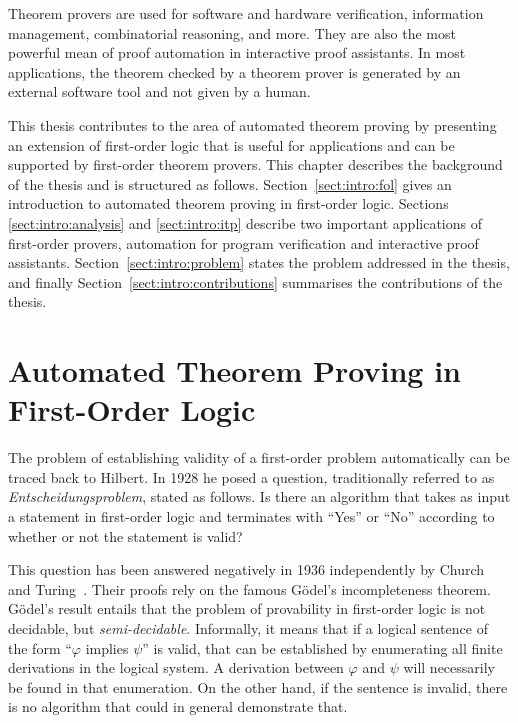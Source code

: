 Theorem provers are used for software and hardware verification, information management, combinatorial reasoning, and more. They are also the most powerful mean of proof automation in interactive proof assistants. In most applications, the theorem checked by a theorem prover is generated by an external software tool and not given by a human. %

This thesis contributes to the area of automated theorem proving by presenting an extension of first-order logic that is useful for applications and can be supported by first-order theorem provers. This chapter describes the background of the thesis and is structured as follows. Section~\ref{sect:intro:fol} gives an introduction to automated theorem proving in first-order logic. Sections \ref{sect:intro:analysis} and \ref{sect:intro:itp} describe two important applications of first-order provers, automation for program verification and interactive proof assistants. Section~\ref{sect:intro:problem} states the problem addressed in the thesis, and finally Section~\ref{sect:intro:contributions} summarises the contributions of the thesis.


\section*{Automated Theorem Proving in\\First-Order Logic}
\label{sect:intro:fol}
The problem of establishing validity of a first-order problem automatically can be traced back to Hilbert. In 1928 he posed a question, traditionally referred to as \emph{Entscheidungsproblem}\iffalse(German for ``decision problem'')\fi, stated as follows. Is there an algorithm that takes as input a statement in first-order logic and terminates with ``Yes'' or ``No'' according to whether or not the statement is valid?

This question has been answered negatively in 1936 independently by Church~\cite{church1936unsolvable} and Turing~\cite{turing1936computable}. Their proofs rely on the famous G\"{o}del's incompleteness theorem\iffalse~\cite{godel1931formal} (for an English translation see e.g. \cite[pp. 4--38]{davis1965undecidable})\fi. G\"{o}del's result entails that the problem of provability in first-order logic is not decidable, but \emph{semi-decidable}. Informally, it means that if a logical sentence of the form ``$\varphi$ implies $\psi$'' is valid, that can be established by enumerating all finite derivations in the logical system. A derivation between $\varphi$ and $\psi$ will necessarily be found in that enumeration. On the other hand, if the sentence is invalid, there is no algorithm that could in general demonstrate that.

